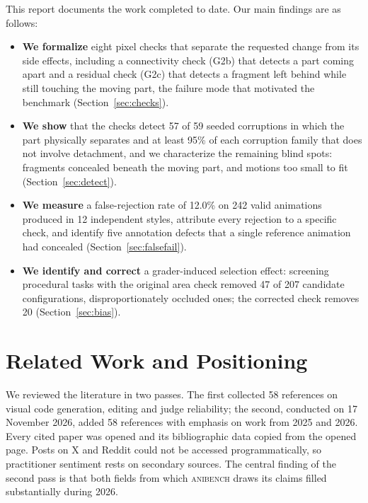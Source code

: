 \documentclass[11pt]{article}
\newcommand{\anibench}{\textsc{anibench}}
\newcommand{\chk}[1]{\textsf{#1}}
\begin{document}
This report documents the work completed to date. Our main findings are as follows:
\begin{itemize}
\item \textbf{We formalize} eight pixel checks that separate the requested change from its side effects, including a connectivity check (\chk{G2b}) that detects a part coming apart and a residual check (\chk{G2c}) that detects a fragment left behind while still touching the moving part, the failure mode that motivated the benchmark (Section~\ref{sec:checks}).
\item \textbf{We show} that the checks detect 57 of 59 seeded corruptions in which the part physically separates and at least 95\% of each corruption family that does not involve detachment, and we characterize the remaining blind spots: fragments concealed beneath the moving part, and motions too small to fit (Section~\ref{sec:detect}).
\item \textbf{We measure} a false-rejection rate of 12.0\% on 242 valid animations produced in 12 independent styles, attribute every rejection to a specific check, and identify five annotation defects that a single reference animation had concealed (Section~\ref{sec:falsefail}).
\item \textbf{We identify and correct} a grader-induced selection effect: screening procedural tasks with the original area check removed 47 of 207 candidate configurations, disproportionately occluded ones; the corrected check removes 20 (Section~\ref{sec:bias}).
\end{itemize}

\section{Related Work and Positioning}
\label{sec:related}

We reviewed the literature in two passes. The first collected 58 references on visual code generation, editing and judge reliability; the second, conducted on 17 November 2026, added 58 references with emphasis on work from 2025 and 2026. Every cited paper was opened and its bibliographic data copied from the opened page. Posts on X and Reddit could not be accessed programmatically, so practitioner sentiment rests on secondary sources. The central finding of the second pass is that both fields from which \anibench{} draws its claims filled substantially during 2026.
\end{document}
